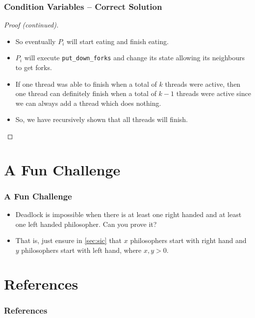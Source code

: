 \documentclass[aspectratio=169, handout, 10pt]{beamer}
\theoremstyle{example}
\begin{document}
\begin{frame}[fragile]\frametitle{Condition Variables -- Correct Solution}%
  \begin{proof}[Proof (continued)]
  \begin{itemize}
  \pause\item So eventually $P_i$ will start eating and finish eating.
  \pause\item $P_i$ will execute \verb!put_down_forks! and change its state allowing its neighbours to get forks.
  \pause\item If one thread was able to finish when a total of $k$ threads were active, then one thread can definitely finish when a total of $k-1$ threads were active since we can always add a thread which does nothing.%
  \pause\item So, we have recursively shown that all threads will finish.
  \end{itemize}
\end{proof}
\end{frame}
\section{A Fun Challenge}
\begin{frame}[fragile]\frametitle{A Fun Challenge}%
  \begin{itemize}
  \pause\item Deadlock is impossible when there is at least one right handed and at least one left handed philosopher. Can you prove it?
  \pause\item That is, just ensure in \ref{sec:sic} that $x$ philosophers start with right hand and $y$ philosophers start with left hand, where $x,y > 0$.
  \end{itemize}
\end{frame}
\appendix
\section{References}
\begin{frame}
  \frametitle<presentation>{References}
%       

  \nocite{*}
  {}
    

 
    

\end{frame}
\end{document}
